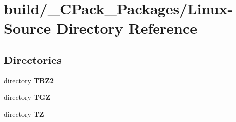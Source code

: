 \section{build/\-\_\-\-C\-Pack\-\_\-\-Packages/\-Linux-\/\-Source Directory Reference}
\label{dir_1368e1bd85cbac3fbc8ca49e984c7dad}
\subsection*{Directories}
\begin{DoxyCompactItemize}
\item 
directory {\bf T\-B\-Z2}
\item 
directory {\bf T\-G\-Z}
\item 
directory {\bf T\-Z}
\end{DoxyCompactItemize}
